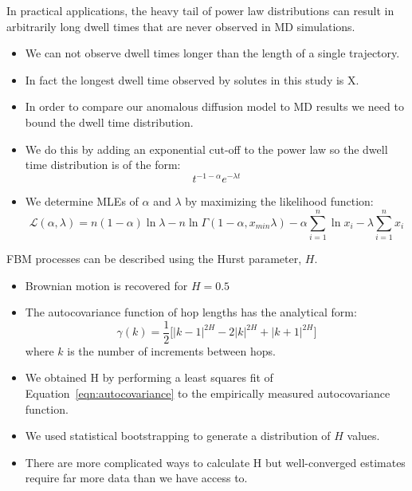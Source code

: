 \documentclass{article}
\begin{document}
  In practical applications, the heavy tail of power law distributions can result in 
  arbitrarily long dwell times that are never observed in MD simulations. 
  \begin{itemize}
    \item We can not observe dwell times longer than the length of a single trajectory.
    \item In fact the longest dwell time observed by solutes in this study is X.
    \item In order to compare our anomalous diffusion model to MD results we need to 
    bound the dwell time distribution.
    \item We do this by adding an exponential cut-off to the power law so the dwell 
    time distribution is of the form:
    \begin{equation}
    t^{-1 - \alpha}e^{-\lambda t}
    \end{equation}
    \item We determine MLEs of $\alpha$ and $\lambda$ by maximizing the likelihood function:~\cite{clauset_power-law_2009}
    \begin{equation}
    \mathcal{L}(\alpha, \lambda) = n(1 - \alpha)\ln\lambda - n\ln\Gamma(1 - \alpha, x_{min}\lambda) - \alpha\sum_{i=1}^{n}\ln x_i - \lambda\sum_{i=1}^n x_i
    \end{equation}
  \end{itemize}
  
  \noindent FBM processes can be described using the Hurst parameter, $H$.
  \begin{itemize}
  	\item Brownian motion is recovered for $H = 0.5$
	\item The autocovariance function of hop lengths has the analytical form:~\cite{mandelbrot_fractional_1968}
    \begin{equation}
	\gamma(k) = \dfrac{1}{2}\bigg[|k-1|^{2H} - 2|k|^{2H} + |k+1|^{2H}\bigg]
	\label{eqn:autocovariance}
	\end{equation}
	where $k$ is the number of increments between hops.
	\item We obtained H by performing a least squares fit of Equation~\ref{eqn:autocovariance}
	to the empirically measured autocovariance function.
	\item We used statistical bootstrapping to generate a distribution of $H$ 
	values. %
	\item There are more complicated ways to calculate H but well-converged estimates 
	require far more data than we have access to.
  \end{itemize}
  
\end{document}
